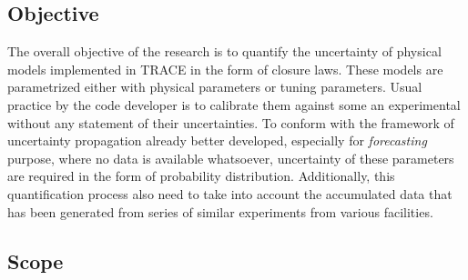 \documentclass[11pt,titlepage]{article}
\begin{document}
\subsection{Objective}

The overall objective of the research is to quantify the uncertainty of physical models implemented in TRACE in the form of closure laws. 
These models are parametrized either with physical parameters or tuning parameters. 
Usual practice by the code developer is to calibrate them against some an experimental without any statement of their uncertainties. 
To conform with the framework of uncertainty propagation already better developed, especially for \emph{forecasting} purpose, where no data is available whatsoever, uncertainty of these parameters are required in the form of probability distribution. 
Additionally, this quantification process also need to take into account the accumulated data that has been generated from series of similar experiments from various facilities.

\subsection{Scope}  
\end{document}
